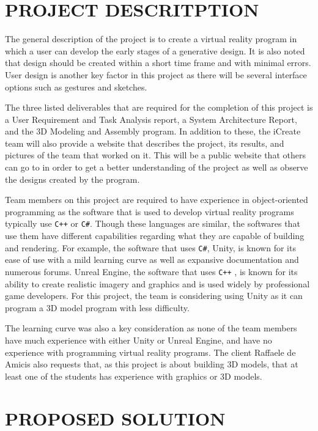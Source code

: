 \documentclass[letterpaper,draftclsnofoot,onecolumn,10 pt]{IEEEtran}
\begin{document}
\section{PROJECT DESCRITPTION}
The general description of the project is to create a virtual reality program in which a user can develop the early stages of a generative design. It is also noted that design should be created within a short time frame and with minimal errors. User design is another key factor in this project as there will be several interface options such as gestures and sketches. \par
The three listed deliverables that are required for the completion of this project is a User Requirement and Task Analysis report, a System Architecture Report, and the 3D Modeling and Assembly program. In addition to these, the iCreate team will also provide a website that describes the project, its results, and pictures of the team that worked on it. This will be a public website that others can go to in order to get a better understanding of the project as well as observe the designs created by the program. \par
Team members on this project are required to have experience in object-oriented programming as the software that is used to develop virtual reality programs typically use \Verb!C++! or \Verb!C#!. Though these languages are similar, the softwares that use them have different capabilities regarding what they are capable of building and rendering. For example, the software that uses \Verb!C#!, Unity, is known for its ease of use with a mild learning curve as well as expansive documentation and numerous forums. Unreal Engine, the software that uses \Verb!C++! , is known for its ability to create realistic imagery and graphics and is used widely by professional game developers. For this project, the team is considering using Unity as it can program a 3D model program with less difficulty. \par
The learning curve was also a key consideration as none of the team members have much experience with either Unity or Unreal Engine, and have no experience with programming virtual reality programs. The client Raffaele de Amicis also requests that, as this project is about building 3D models, that at least one of the students has experience with graphics or 3D models. 


\section{PROPOSED SOLUTION}
\end{document}

